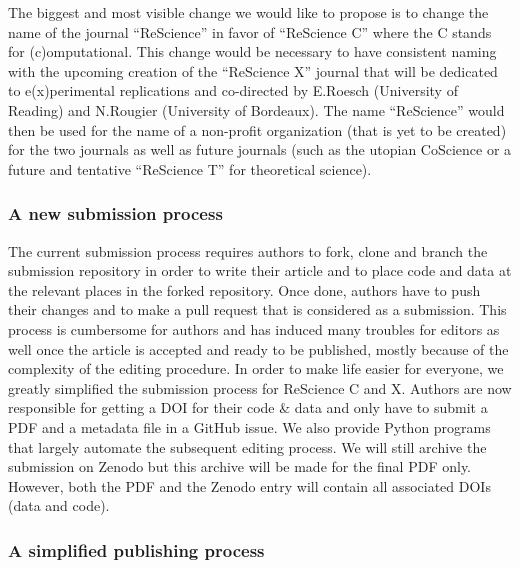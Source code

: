 The biggest and most visible change we would like to propose is to change the
name of the journal ``ReScience'' in favor of ``ReScience C'' where the C
stands for (c)omputational. This change would be necessary to have consistent
naming with the upcoming creation of the ``ReScience X'' journal that will be
dedicated to e(x)perimental replications and co-directed by E.Roesch
(University of Reading) and N.Rougier (University of Bordeaux). The name
``ReScience'' would then be used for the name of a non-profit organization
(that is yet to be created) for the two journals as well as future journals
(such as the utopian CoScience\supercite{Rougier:2017} or a future and
tentative ``ReScience T'' for theoretical science).


\subsubsection{A new submission process}

The current submission process requires authors to fork, clone and branch the
submission repository in order to write their article and to place code and
data at the relevant places in the forked repository. Once done, authors have
to push their changes and to make a pull request that is considered as a
submission. This process is cumbersome for authors and has induced many
troubles for editors as well once the article is accepted and ready to be
published, mostly because of the complexity of the editing procedure. In order
to make life easier for everyone, we greatly simplified the submission process
for ReScience C and X. Authors are now responsible for getting a DOI for their
code \& data and only have to submit a PDF and a metadata file in a GitHub
issue.
We also provide Python programs that largely automate the subsequent editing
process. We will still archive the submission on Zenodo but this archive will
be made for the final PDF only. However, both the PDF and the Zenodo entry will
contain all associated DOIs (data and code).


\subsubsection{A simplified publishing process}

